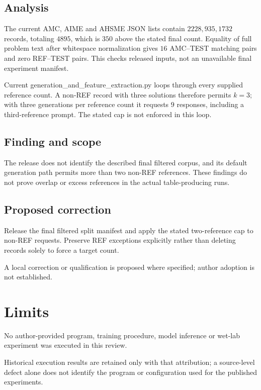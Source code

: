 \documentclass[11pt]{article}
\begin{document}
\subsection*{Analysis}

The current AMC, AIME and AHSME JSON lists contain \(2228,935,1732\) records, totaling \(4895\), which is \(350\) above the stated final count. Equality of full problem text after whitespace normalization gives \(16\) AMC–TEST matching pairs and zero REF–TEST pairs. This checks released inputs, not an unavailable final experiment manifest.

Current generation\_and\_feature\_extraction.py loops through every supplied reference count. A non-REF record with three solutions therefore permits \(k=3\); with three generations per reference count it requests \(9\) responses, including a third-reference prompt. The stated cap is not enforced in this loop.

\subsection*{Finding and scope}

The release does not identify the described final filtered corpus, and its default generation path permits more than two non-REF references. These findings do not prove overlap or excess references in the actual table-producing runs.

\subsection*{Proposed correction}

Release the final filtered split manifest and apply the stated two-reference cap to non-REF requests. Preserve REF exceptions explicitly rather than deleting records solely to force a target count.

A local correction or qualification is proposed where specified; author adoption is not established.

\section*{Limits}

No author-provided program, training procedure, model inference or wet-lab experiment was executed in this review.\par

Historical execution results are retained only with that attribution; a source-level defect alone does not identify the program or configuration used for the published experiments.\par
\end{document}
